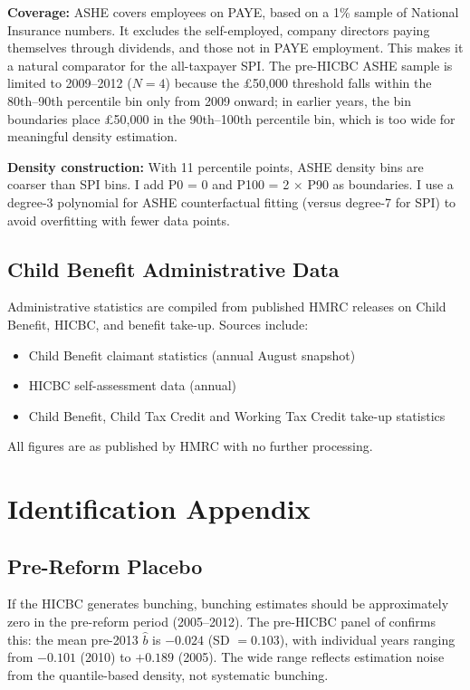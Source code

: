 \documentclass[12pt]{article}
\newcommand{\bhat}{\hat{b}}
\begin{document}
\textbf{Coverage:} ASHE covers employees on PAYE, based on a 1\% sample of National Insurance numbers. It excludes the self-employed, company directors paying themselves through dividends, and those not in PAYE employment. This makes it a natural comparator for the all-taxpayer SPI. The pre-HICBC ASHE sample is limited to 2009--2012 ($N=4$) because the \pounds50,000 threshold falls within the 80th--90th percentile bin only from 2009 onward; in earlier years, the bin boundaries place \pounds50,000 in the 90th--100th percentile bin, which is too wide for meaningful density estimation.

\textbf{Density construction:} With 11 percentile points, ASHE density bins are coarser than SPI bins. I add P0 = 0 and P100 = 2 $\times$ P90 as boundaries. I use a degree-3 polynomial for ASHE counterfactual fitting (versus degree-7 for SPI) to avoid overfitting with fewer data points.

\subsection{Child Benefit Administrative Data}

Administrative statistics are compiled from published HMRC releases on Child Benefit, HICBC, and benefit take-up. Sources include:
\begin{itemize}
    \item Child Benefit claimant statistics (annual August snapshot)
    \item HICBC self-assessment data (annual)
    \item Child Benefit, Child Tax Credit and Working Tax Credit take-up statistics
\end{itemize}

All figures are as published by HMRC with no further processing.


\section{Identification Appendix}
\label{sec:id_appendix}

\subsection{Pre-Reform Placebo}

If the HICBC generates bunching, bunching estimates should be approximately zero in the pre-reform period (2005--2012). The pre-HICBC panel of  confirms this: the mean pre-2013 $\bhat$ is $-0.024$ (SD $= 0.103$), with individual years ranging from $-0.101$ (2010) to $+0.189$ (2005). The wide range reflects estimation noise from the quantile-based density, not systematic bunching.
\end{document}
